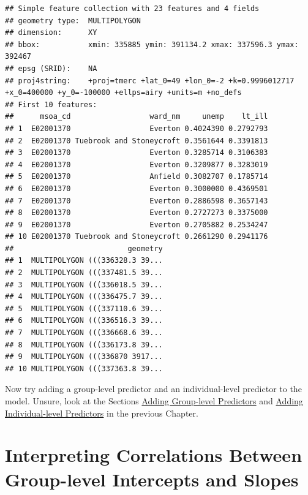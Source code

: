 \documentclass[]{book}
\newenvironment{Shaded}{\begin{snugshade}}{\end{snugshade}}
\newcommand{\KeywordTok}[1]{\textcolor[rgb]{0.13,0.29,0.53}{\textbf{#1}}}
\newcommand{\StringTok}[1]{\textcolor[rgb]{0.31,0.60,0.02}{#1}}
\newcommand{\OperatorTok}[1]{\textcolor[rgb]{0.81,0.36,0.00}{\textbf{#1}}}
\newcommand{\NormalTok}[1]{#1}
\begin{document}
\begin{Shaded}
\end{Shaded}

\begin{verbatim}
## Simple feature collection with 23 features and 4 fields
## geometry type:  MULTIPOLYGON
## dimension:      XY
## bbox:           xmin: 335885 ymin: 391134.2 xmax: 337596.3 ymax: 392467
## epsg (SRID):    NA
## proj4string:    +proj=tmerc +lat_0=49 +lon_0=-2 +k=0.9996012717 +x_0=400000 +y_0=-100000 +ellps=airy +units=m +no_defs
## First 10 features:
##      msoa_cd                  ward_nm     unemp    lt_ill
## 1  E02001370                  Everton 0.4024390 0.2792793
## 2  E02001370 Tuebrook and Stoneycroft 0.3561644 0.3391813
## 3  E02001370                  Everton 0.3285714 0.3106383
## 4  E02001370                  Everton 0.3209877 0.3283019
## 5  E02001370                  Anfield 0.3082707 0.1785714
## 6  E02001370                  Everton 0.3000000 0.4369501
## 7  E02001370                  Everton 0.2886598 0.3657143
## 8  E02001370                  Everton 0.2727273 0.3375000
## 9  E02001370                  Everton 0.2705882 0.2534247
## 10 E02001370 Tuebrook and Stoneycroft 0.2661290 0.2941176
##                          geometry
## 1  MULTIPOLYGON (((336328.3 39...
## 2  MULTIPOLYGON (((337481.5 39...
## 3  MULTIPOLYGON (((336018.5 39...
## 4  MULTIPOLYGON (((336475.7 39...
## 5  MULTIPOLYGON (((337110.6 39...
## 6  MULTIPOLYGON (((336516.3 39...
## 7  MULTIPOLYGON (((336668.6 39...
## 8  MULTIPOLYGON (((336173.8 39...
## 9  MULTIPOLYGON (((336870 3917...
## 10 MULTIPOLYGON (((337363.8 39...
\end{verbatim}

Now try adding a group-level predictor and an individual-level predictor
to the model. Unsure, look at the Sections
\protect\hyperlink{adding-group-level-predictors}{Adding Group-level
Predictors} and
\protect\hyperlink{adding-individual-level-predictors}{Adding
Individual-level Predictors} in the previous Chapter.

\hypertarget{interpreting-correlations-between-group-level-intercepts-and-slopes}{\section{Interpreting
Correlations Between Group-level Intercepts and
Slopes}\label{interpreting-correlations-between-group-level-intercepts-and-slopes}}
\end{document}
